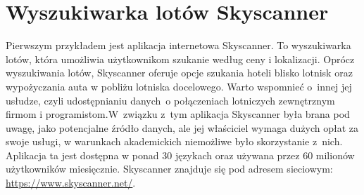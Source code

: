 \documentclass[12pt, twoside]{report}
\begin{document}
\section{Wyszukiwarka lotów Skyscanner}
Pierwszym przykładem jest aplikacja internetowa Skyscanner. To wyszukiwarka lotów, która umożliwia użytkownikom szukanie według ceny i lokalizacji. Oprócz wyszukiwania lotów, Skyscanner oferuje opcje szukania hoteli blisko lotnisk oraz wypożyczania auta w pobliżu lotniska docelowego. Warto wspomnieć o~innej jej usłudze, czyli udostępnianiu danych~o połączeniach lotniczych zewnętrznym firmom i programistom.W~związku z~tym aplikacja Skyscanner była brana pod uwagę, jako potencjalne źródło danych, ale jej właściciel wymaga dużych opłat za swoje usługi, w warunkach akademickich niemożliwe było skorzystanie z~nich.
Aplikacja ta jest dostępna w ponad 30 językach oraz używana przez 60 milionów użytkowników miesięcznie. Skyscanner znajduje się pod adresem sieciowym: 
\url{https://www.skyscanner.net/}.
\end{document}
